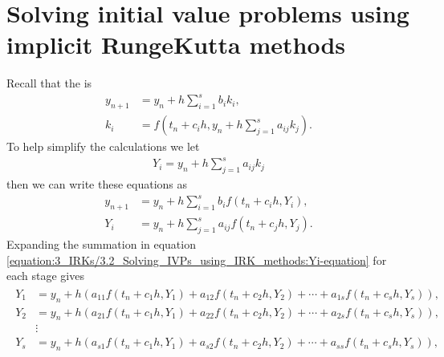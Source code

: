 \documentclass[letterpaper,10pt,english]{jupyterBook}
\begin{document}
\section{Solving initial value problems using implicit Runge\sphinxhyphen{}Kutta methods}
\label{\detokenize{3_IRKs/3.2_Solving_IVPs_using_IRK_methods:solving-initial-value-problems-using-implicit-runge-kutta-methods}}\label{\detokenize{3_IRKs/3.2_Solving_IVPs_using_IRK_methods:solving-ivps-using-irk-methods-section}}\label{\detokenize{3_IRKs/3.2_Solving_IVPs_using_IRK_methods::doc}}
\sphinxAtStartPar
Recall that the {\hyperref[\detokenize{2_ERKs/2.0_ERKs:rk-definition}]{}} is
\begin{align*}
   y_{n+1} &= y_n + h \sum_{i=1}^s b_i k_i,\\
   k_i &= f(t_n +c_i h,y_n + h \sum_{j=1}^s a_{ij} k_j).
\end{align*}
\sphinxAtStartPar
To help simplify the calculations we let
\begin{equation}\label{equation:3_IRKs/3.2_Solving_IVPs_using_IRK_methods:Yi-equation}
\begin{split}Y_i = y_n +h \displaystyle\sum_{j=1}^s a_{ij} k_j\end{split}
\end{equation}
\sphinxAtStartPar
then we can write these equations as
\begin{align*}
   y_{n+1} &= y_n + h \sum_{i=1}^s b_i f(t_n + c_i h, Y_i),\\
   Y_i &= y_n + h \sum_{j=1}^s a_{ij} f(t_n + c_j h, Y_j).
\end{align*}
\sphinxAtStartPar
Expanding the summation in equation \eqref{equation:3_IRKs/3.2_Solving_IVPs_using_IRK_methods:Yi-equation} for each stage gives
\begin{equation}\label{equation:3_IRKs/3.2_Solving_IVPs_using_IRK_methods:irk-stage-values-equation}
\begin{split}\begin{align*}
    Y_1 &= y_n + h(a_{11} f(t_n + c_1 h, Y_1) + a_{12} f(t_n + c_2 h, Y_2) + \cdots + a_{1s} f(t_n + c_s h, Y_s)), \\
    Y_2 &= y_n + h(a_{21} f(t_n + c_1 h, Y_1) + a_{22} f(t_n + c_2 h, Y_2) + \cdots + a_{2s} f(t_n + c_s h, Y_s)), \\
    & \vdots \\
    Y_s &= y_n + h(a_{s1} f(t_n + c_1 h, Y_1) + a_{s2} f(t_n + c_2 h, Y_2) + \cdots + a_{ss} f(t_n + c_s h, Y_s)), \\
\end{align*}\end{split}
\end{equation}
\end{document}
